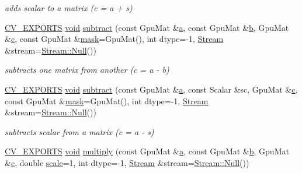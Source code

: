 \begin{DoxyCompactItemize}
\begin{DoxyCompactList}\small\item\em adds scalar to a matrix (c = a + s) \end{DoxyCompactList}\item 
\hyperlink{core_2types__c_8h_a1bf9f0e121b54272da02379cfccd0a2b}{C\-V\-\_\-\-E\-X\-P\-O\-R\-T\-S} \hyperlink{legacy_8hpp_a8bb47f092d473522721002c86c13b94e}{void} \hyperlink{namespacecv_1_1gpu_abcb4b7f5db9a5658a7079777541804d6}{subtract} (const Gpu\-Mat \&\hyperlink{legacy_8hpp_a1031d0e0a97a340abfe0a6ab9e831045}{a}, const Gpu\-Mat \&\hyperlink{legacy_8hpp_ac04272e8ca865b8fba18d36edae9fd2a}{b}, Gpu\-Mat \&\hyperlink{legacy_8hpp_a1971420173e06f45845eed2ab4e3d5d0}{c}, const Gpu\-Mat \&\hyperlink{tracking_8hpp_a6b13ecd2fd6ec7ad422f1d7863c3ad19}{mask}=Gpu\-Mat(), int dtype=-\/1, \hyperlink{classcv_1_1gpu_1_1Stream}{Stream} \&stream=\hyperlink{classcv_1_1gpu_1_1Stream_af96c23564834f88333dcb8997df553f1}{Stream\-::\-Null}())
\begin{DoxyCompactList}\small\item\em subtracts one matrix from another (c = a -\/ b) \end{DoxyCompactList}\item 
\hyperlink{core_2types__c_8h_a1bf9f0e121b54272da02379cfccd0a2b}{C\-V\-\_\-\-E\-X\-P\-O\-R\-T\-S} \hyperlink{legacy_8hpp_a8bb47f092d473522721002c86c13b94e}{void} \hyperlink{namespacecv_1_1gpu_a15683010823353c64b96a64f0459c23b}{subtract} (const Gpu\-Mat \&\hyperlink{legacy_8hpp_a1031d0e0a97a340abfe0a6ab9e831045}{a}, const Scalar \&sc, Gpu\-Mat \&\hyperlink{legacy_8hpp_a1971420173e06f45845eed2ab4e3d5d0}{c}, const Gpu\-Mat \&\hyperlink{tracking_8hpp_a6b13ecd2fd6ec7ad422f1d7863c3ad19}{mask}=Gpu\-Mat(), int dtype=-\/1, \hyperlink{classcv_1_1gpu_1_1Stream}{Stream} \&stream=\hyperlink{classcv_1_1gpu_1_1Stream_af96c23564834f88333dcb8997df553f1}{Stream\-::\-Null}())
\begin{DoxyCompactList}\small\item\em subtracts scalar from a matrix (c = a -\/ s) \end{DoxyCompactList}\item 
\hyperlink{core_2types__c_8h_a1bf9f0e121b54272da02379cfccd0a2b}{C\-V\-\_\-\-E\-X\-P\-O\-R\-T\-S} \hyperlink{legacy_8hpp_a8bb47f092d473522721002c86c13b94e}{void} \hyperlink{namespacecv_1_1gpu_a5aa3670aed86f67799f31f841207ae18}{multiply} (const Gpu\-Mat \&\hyperlink{legacy_8hpp_a1031d0e0a97a340abfe0a6ab9e831045}{a}, const Gpu\-Mat \&\hyperlink{legacy_8hpp_ac04272e8ca865b8fba18d36edae9fd2a}{b}, Gpu\-Mat \&\hyperlink{legacy_8hpp_a1971420173e06f45845eed2ab4e3d5d0}{c}, double \hyperlink{objdetect_8hpp_a1f622eb9b9e06b30862ca90cdf2c078b}{scale}=1, int dtype=-\/1, \hyperlink{classcv_1_1gpu_1_1Stream}{Stream} \&stream=\hyperlink{classcv_1_1gpu_1_1Stream_af96c23564834f88333dcb8997df553f1}{Stream\-::\-Null}())

\end{DoxyCompactItemize}
